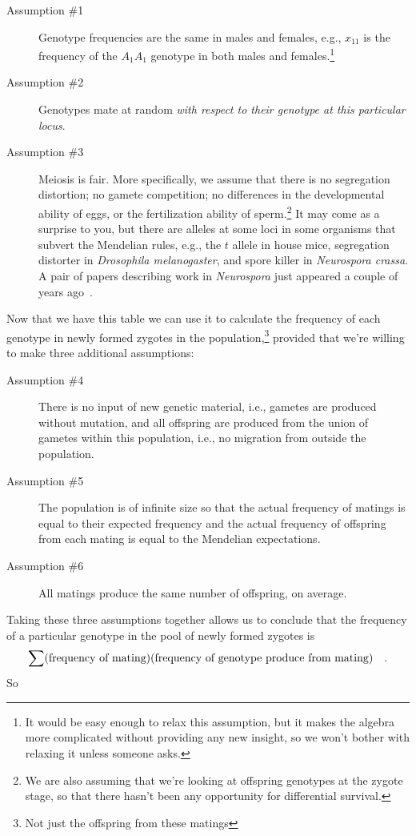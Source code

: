 \begin{description}

\item[Assumption \#1] Genotype frequencies are the same in males and
  females, e.g., $x_{11}$ is the frequency of the $A_1A_1$ genotype in
  both males and females.\footnote{It would be easy enough to relax
    this assumption, but it makes the algebra more complicated without
    providing any new insight, so we won't bother with relaxing it
    unless someone asks.}

\item[Assumption \#2] Genotypes mate at random {\it with respect to
  their genotype at this particular locus}.

\item[Assumption \#3] Meiosis is fair. More specifically, we assume
  that there is no segregation distortion; no gamete competition; no
  differences in the developmental ability of eggs, or the
  fertilization ability of sperm.\footnote{We are also assuming that
    we're looking at offspring genotypes at the zygote stage, so that
    there hasn't been any opportunity for differential survival.} It
  may come as a surprise to you, but there are alleles at some loci in
  some organisms that subvert the Mendelian rules, e.g., the $t$
  allele in house mice, segregation distorter in {\it Drosophila
    melanogaster}, and spore killer in {\it Neurospora crassa\/}. A
  pair of papers describing work in {\it Neurospora\/} just appeared a
  couple of years ago~\cite{Hammond-etal-2012,Saupe-2012}.

\end{description}
Now that we have this table we can use it to calculate the frequency
of each genotype in newly formed zygotes in the
population,\footnote{Not just the offspring from these matings}
provided that we're willing to make three additional assumptions:

\begin{description}

\item[Assumption \#4] There is no input of new genetic material, i.e.,
gametes are produced without mutation, and all offspring are produced
from the union of gametes within this population, i.e., no migration
from outside the population.

\item[Assumption \#5] The population is of infinite size so that the
actual frequency of matings is equal to their expected frequency and
the actual frequency of offspring from each mating is equal to the
Mendelian expectations.

\item[Assumption \#6] All matings produce the same number of
offspring, on average.

\end{description}
Taking these three assumptions together allows us to conclude that the
frequency of a particular genotype in the pool of newly formed zygotes
is
\[
\sum(\hbox{frequency of mating})(\hbox{frequency of genotype produce
  from mating}) \quad .
\]
So

